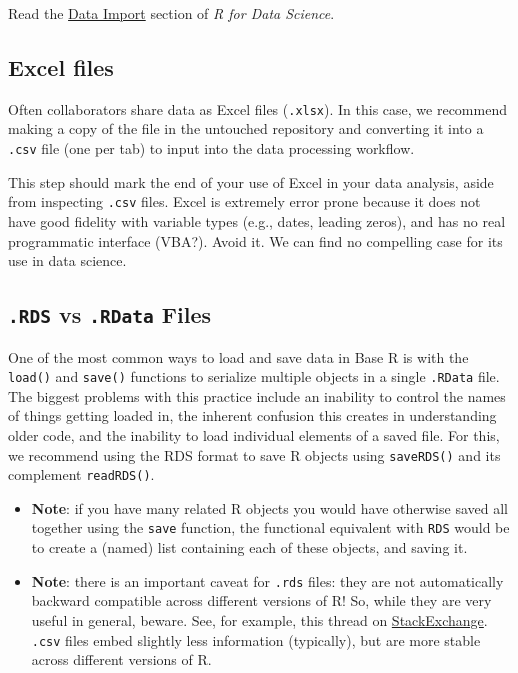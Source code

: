 \documentclass[
]{book}
\begin{document}
Read the \href{https://r4ds.had.co.nz/data-import.html}{Data Import} section of \emph{R for Data Science}.

\hypertarget{excel-files}{%
\subsection{Excel files}\label{excel-files}}

Often collaborators share data as Excel files (\texttt{.xlsx}). In this case, we recommend making a copy of the file in the untouched repository and converting it into a \texttt{.csv} file (one per tab) to input into the data processing workflow.

This step should mark the end of your use of Excel in your data analysis, aside from inspecting \texttt{.csv} files. Excel is extremely error prone because it does not have good fidelity with variable types (e.g., dates, leading zeros), and has no real programmatic interface (VBA?). Avoid it. We can find no compelling case for its use in data science.

\hypertarget{rds-vs-.rdata-files}{%
\subsection{\texorpdfstring{\texttt{.RDS} vs \texttt{.RData} Files}{.RDS vs .RData Files}}\label{rds-vs-.rdata-files}}

One of the most common ways to load and save data in Base R is with the \texttt{load()} and \texttt{save()} functions to serialize multiple objects in a single \texttt{.RData} file. The biggest problems with this practice include an inability to control the names of things getting loaded in, the inherent confusion this creates in understanding older code, and the inability to load individual elements of a saved file. For this, we recommend using the RDS format to save R objects using \texttt{saveRDS()} and its complement \texttt{readRDS()}.

\begin{itemize}
\item
  \textbf{Note}: if you have many related R objects you would have otherwise saved all together using the \texttt{save} function, the functional equivalent with \texttt{RDS} would be to create a (named) list containing each of these objects, and saving it.
\item
  \textbf{Note}: there is an important caveat for \texttt{.rds} files: they are not automatically backward compatible across different versions of R! So, while they are very useful in general, beware. See, for example, this thread on \href{https://stackoverflow.com/questions/56704638/write-a-file-using-saverds-so-that-it-is-backwards-compatible-with-old-versi}{StackExchange}. \texttt{.csv} files embed slightly less information (typically), but are more stable across different versions of R.
\end{itemize}
\end{document}
